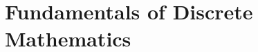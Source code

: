 \documentclass[table]{book}
\author{Joseph M. Diza} %
\theoremstyle{definition}
\begin{document}
%


%

\tableofcontents

\part{Fundamentals of Discrete Mathematics}


\end{document}
